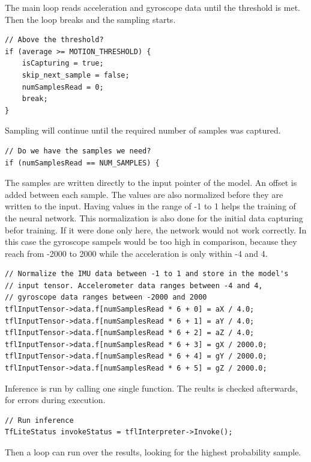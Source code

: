 \documentclass[a4paper,titlepage]{article}
\begin{document}
The main loop reads acceleration and gyroscope data until the threshold is met.
Then the loop breaks and the sampling starts.

\begin{lstlisting}
// Above the threshold?
if (average >= MOTION_THRESHOLD) {
    isCapturing = true;
    skip_next_sample = false;
    numSamplesRead = 0;
    break;
}
\end{lstlisting}

Sampling will continue until the required number of samples was captured.

\begin{lstlisting}
// Do we have the samples we need?
if (numSamplesRead == NUM_SAMPLES) {
\end{lstlisting}

The samples are written directly to the input pointer of the model.
An offset is added between each sample.
The values are also normalized before they are written to the input.
Having values in the range of -1 to 1 helps the training of the neural network.
This normalization is also done for the initial data capturing befor training.
If it were done only here, the network would not work correctly.
In this case the gyroscope sampels would be too high in comparison, because they reach from -2000 to 2000 while the acceleration is only within -4 and 4.

\begin{lstlisting}
// Normalize the IMU data between -1 to 1 and store in the model's
// input tensor. Accelerometer data ranges between -4 and 4,
// gyroscope data ranges between -2000 and 2000
tflInputTensor->data.f[numSamplesRead * 6 + 0] = aX / 4.0;
tflInputTensor->data.f[numSamplesRead * 6 + 1] = aY / 4.0;
tflInputTensor->data.f[numSamplesRead * 6 + 2] = aZ / 4.0;
tflInputTensor->data.f[numSamplesRead * 6 + 3] = gX / 2000.0;
tflInputTensor->data.f[numSamplesRead * 6 + 4] = gY / 2000.0;
tflInputTensor->data.f[numSamplesRead * 6 + 5] = gZ / 2000.0;
\end{lstlisting}

Inference is run by calling one single function.
The reults is checked afterwards, for errors during execution.

\begin{lstlisting}
// Run inference
TfLiteStatus invokeStatus = tflInterpreter->Invoke();
\end{lstlisting}

Then a loop can run over the results, looking for the highest probability sample.
\end{document}
